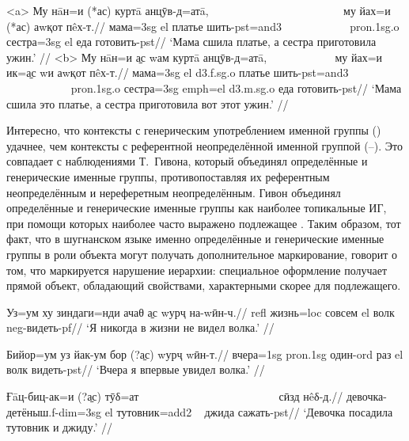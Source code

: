 \a<a> \begingl
\gla Му нāн=и (*ас) куртā анцӯв-д=атā, ~~~~~~~~~~~~~~~~~~~~~~~ му йах=и (*ас) аwқот пêх-т.//
 мама={\sc 3sg} {\sc el} платье шить-{\sc pst=and3} ~~~~~~~~~~~ {\sc pron.1sg.o} сестра={\sc 3sg} {\sc el} еда готовить-{\sc pst}//
\glft ‘Мама сшила платье, а сестра приготовила ужин.’ \trailingcitation{[элицитация, 2022]}//
\endgl
\a<b> \begingl
\gla Му нāн=и \b{ас} wам куртā анцӯв-д=атā, ~~~~~~~~~~~ му йах=и ик=\b{ас} wи аwқот пêх-т.//
 мама={\sc 3sg} {\sc el} {\sc d3.f.sg.o} платье шить-{\sc pst=and3} ~~~~~~~~~~~ {\sc pron.1sg.o} сестра={\sc 3sg} {\sc emph=el} {\sc d3.m.sg.o} еда готовить-{\sc pst}//
\glft ‘Мама сшила это платье, а сестра приготовила вот этот ужин.’ \trailingcitation{[элицитация, 2022]}//
\endgl \xe

Интересно, что контексты с генерическим употреблением именной группы () удачнее, чем контексты с референтной неопределённой именной группой (–). Это совпадает с наблюдениями Т.~Гивона, который объединял определённые и генерические именные группы, противопоставляя их референтным неопределённым и нереферетным неопределённым. Гивон объединял определённые и генерические именные группы как наиболее топикальные ИГ, при помощи которых наиболее часто выражено подлежащее \parencite[295]{givon1979}. Таким образом, тот факт, что в шугнанском языке именно определённые и генерические именные группы в роли объекта могут получать дополнительное маркирование, говорит о том, что маркируется нарушение иерархии: специальное оформление получает прямой объект, обладающий свойствами, характерными скорее для подлежащего.

\begingl
\gla Уз=ум ху зиндаги=нди ачаθ \b{ас} wурҷ на-wӣн-ч.//
 {\sc refl} жизнь={\sc loc} совсем {\sc el} волк {\sc neg}-видеть-{\sc pf}//
\glft ‘Я никогда в жизни не видел волка.’ \trailingcitation{[элицитация, 2022]}//
\endgl \xe

\begingl
\gla Бийор=ум уз йак-ум бор (?\b{ас}) wурҷ wӣн-т.//
\glc вчера={\sc 1sg} {\sc pron.1sg} один-{\sc ord} раз {\sc el} волк видеть-{\sc pst}//
\glft ‘Вчера я впервые увидел волка.’ \trailingcitation{[элицитация, 2022]}//
\endgl \xe

\begingl
\gla Ғāц-биц-ак=и (?\b{ас}) тӯδ=ат ~~~~~~~~~~~~~~~~~~~~~~~~ сӣзд нêδ-д.//
\glc девочка-детёныш.{\sc f-dim=3sg} {\sc el} тутовник={\sc add2} ~ джида сажать-{\sc pst}//
\glft ‘Девочка посадила тутовник и джиду.’ \trailingcitation{[элицитация, 2022]}//
\endgl \xe

